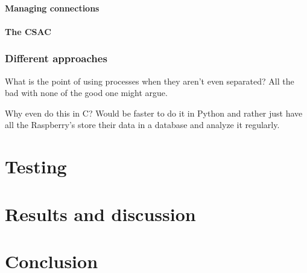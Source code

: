 \documentclass[12pt,english,a4paper]{report}
\begin{document}
\subsubsection{Managing connections}

\subsubsection{The CSAC}

\subsection{Different approaches}
What is the point of using processes when they aren't even separated? All the bad with none of the good one might argue. 

Why even do this in C? Would be faster to do it in Python and rather just have all the Raspberry's store their data in a database and analyze it regularly. 

\newpage
\chapter{Testing}

\newpage
\chapter{Results and discussion}


\newpage
\chapter{Conclusion}

\newpage



\newpage
\printbibliography[title={Complete Bibliography},heading=bibintoc]
\end{document}
